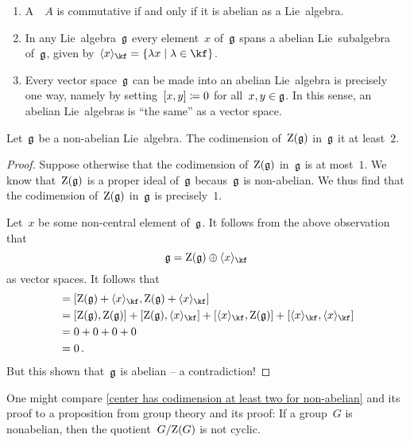 \begin{examples}
	\leavevmode
	\begin{enumerate}
		\item
			A~{\algebra{$\kf$}}~$A$ is commutative if and only if it is abelian as a Lie~algebra.
		\item
			In any Lie~algebra~$\mathfrak{g}$ every element~$x$ of~$\mathfrak{g}$ spans a {\onedimensional} abelian Lie~subalgebra of~$\mathfrak{g}$, given by~$\gen{x}_{\kf} = \{ \lambda x \suchthat \lambda \in \kf \}$.
		\item
			Every vector space~$\mathfrak{g}$ can be made into an abelian Lie~algebra is precisely one way, namely by setting~$[x, y] \coloneqq 0$ for all~$x, y \in \mathfrak{g}$.
			In this sense, an abelian Lie~algebras is \enquote{the same} as a vector space.
	\end{enumerate}
\end{examples}


\begin{lemma}
	\label{center has codimension at least two for non-abelian}
	Let~$\mathfrak{g}$ be a non-abelian Lie~algebra.
	The codimension of~$\operatorname{Z}(\mathfrak{g})$ in~$\mathfrak{g}$ it at least~$2$.
\end{lemma}


\begin{proof}
	Suppose otherwise that the codimension of~$\operatorname{Z}(\mathfrak{g})$ in~$\mathfrak{g}$ is at most~$1$.
	We know that~$\operatorname{Z}(\mathfrak{g})$ is a proper ideal of~$\mathfrak{g}$ becaus~$\mathfrak{g}$ is non-abelian.
	We thus find that the codimension of~$\operatorname{Z}(\mathfrak{g})$ in~$\mathfrak{g}$ is precisely~$1$.

	Let~$x$ be some non-central element of~$\mathfrak{g}$.
	It follows from the above observation that
	\[
		\glie
		=
		\centerlie(\glie) \oplus \gen{x}_{\kf}
	\]
	as vector spaces.
	It follows that
	\begin{align*}
		[\glie, \glie]
		&=
		[ \centerlie(\glie) + \gen{x}_{\kf}, \centerlie(\glie) + \gen{x}_{\kf} ]
		\\
		&=
		[ \centerlie(\glie), \centerlie(\glie) ]
		+ [ \centerlie(\glie), \gen{x}_{\kf} ]
		+ [ \gen{x}_{\kf}, \centerlie(\glie) ]
		+ [ \gen{x}_{\kf}, \gen{x}_{\kf} ]
		\\
		&=
		0 + 0 + 0 + 0
		\\
		&=
		0 \,.
	\end{align*}
	But this shown that~$\mathfrak{g}$ is abelian -- a contradiction!
\end{proof}


\begin{remark}
	One might compare \cref{center has codimension at least two for non-abelian} and its proof to a proposition from group theory and its proof:
	If a group~$G$ is nonabelian, then the quotient~$G / {\operatorname{Z}(G)}$ is not cyclic.
\end{remark}



